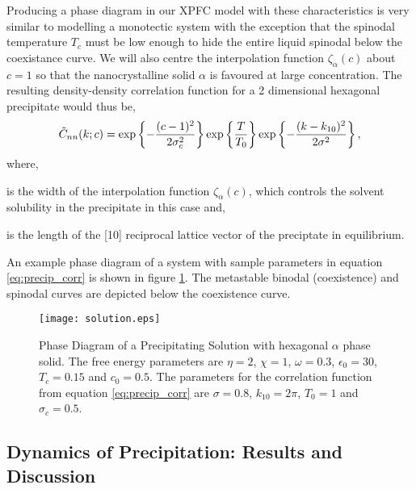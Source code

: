 
Producing a phase diagram in our XPFC model with these characteristics is very
similar to modelling a monotectic system with the exception that the spinodal
temperature $T_c$ must be low enough to hide the entire liquid spinodal below
the coexistance curve.  We will also centre the interpolation function
$\zeta_\alpha(c)$ about $c = 1$ so that the nanocrystalline solid $\alpha$ is
favoured at large concentration. The resulting density-density correlation
function for a 2 dimensional hexagonal precipitate would thus be,
%
\begin{equation}
    \label{eq:precip_corr}
    \tilde{C}_{nn}(k; c) = \exp\left\lbrace - \frac{(c - 1)^2}{2\sigma_c^2}\right\rbrace
        \exp\left\lbrace \frac{T}{T_0} \right\rbrace 
        \exp\left\lbrace - \frac{(k - k_{10})^2}{2\sigma^2} \right\rbrace,
\end{equation}
%
where,
\begin{description}[labelwidth=1cm, align=right]
    \item[$\sigma_c$] is the width of the interpolation function
        $\zeta_\alpha(c)$, which controls the solvent solubility in the
        precipitate in this case and,
    \item[$k_{10}$] is the length of the [10] reciprocal lattice vector of the
        preciptate in equilibrium.
\end{description}

An example phase diagram of a system with sample parameters in equation
\ref{eq:precip_corr} is shown in figure \ref{fig:precip_phase_dia}. The
metastable binodal (coexistence) and spinodal curves are depicted below the
coexistence curve.

\begin{figure}
    \centering	
    \texttt{[image: solution.eps]}
    \caption[Coexistance Phase Diagram with Metastable Spinodal]{
        \label{fig:precip_phase_dia} Phase Diagram of a Precipitating Solution
        with hexagonal $\alpha$ phase solid. The free energy parameters are
        $\eta = 2$, $\chi = 1$, $\omega=0.3$, $\epsilon_0=30$, $T_c = 0.15$ and
        $c_0 = 0.5$. The parameters for the correlation function from equation
        \ref{eq:precip_corr} are $\sigma = 0.8$, $k_{10} = 2\pi$, $T_0 = 1$ and
        $\sigma_c = 0.5$.
    }
\end{figure}

\subsection{Dynamics of Precipitation: Results and Discussion} %

